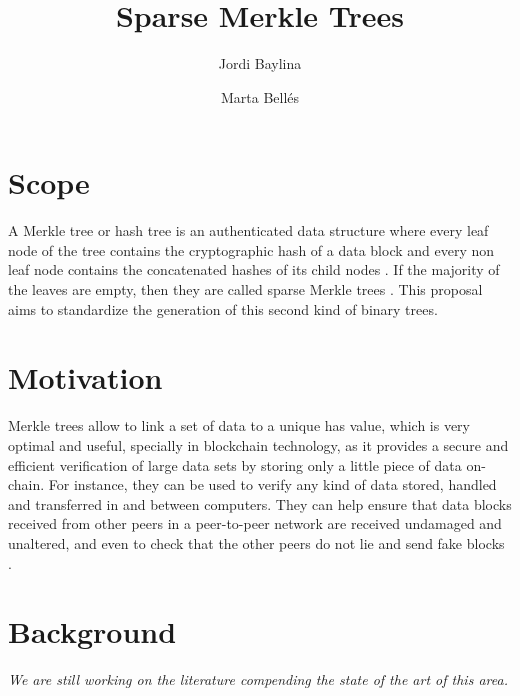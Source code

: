\documentclass[11pt]{article}
\title{ Sparse Merkle Trees \vspace{-0.2cm} }
\author[1]{Jordi Baylina}
\author[1,2]{Marta Bellés}
\affil[1]{iden3}
\affil[2]{Universitat Pompeu Fabra}
\date{} %
\begin{document}
\maketitle 
\vspace{1cm}
\tableofcontents

\vspace{0.5cm}


\newpage
\section{Scope}
A Merkle tree or hash tree is an authenticated data structure where every leaf node of the tree contains the cryptographic hash of a data block and every non leaf node contains the concatenated hashes of its child nodes \cite{compact}. If the majority of the leaves are empty, then they are called sparse Merkle trees \cite{security-mt}. This proposal aims to standardize the generation of this second kind of binary trees.


\section{Motivation}
Merkle trees allow to link a set of data to a unique has value, which is very optimal and useful, specially in blockchain technology, as it provides a secure and efficient verification of large data sets by storing only a little piece of data on-chain. 
% 
For instance, they can be used to verify any kind of data stored, handled and transferred in and between computers. They can help ensure that data blocks received from other peers in a peer-to-peer network are received undamaged and unaltered, and even to check that the other peers do not lie and send fake blocks \cite{wikipediansdata}. 


\section{Background}
{\it We are still working on the literature compending the state of the art of this area.} %

%
\end{document}
